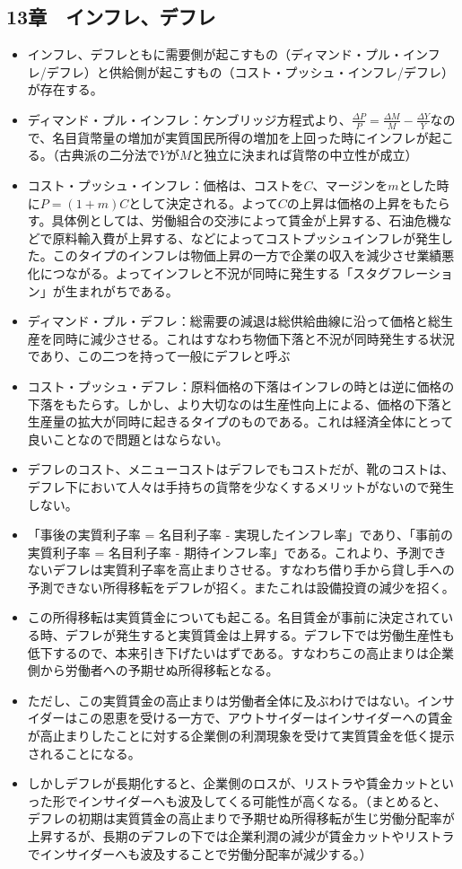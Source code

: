 \documentclass{jsarticle}
\begin{document}
\subsection{13章　インフレ、デフレ}
\begin{itemize}
	\item インフレ、デフレともに需要側が起こすもの（ディマンド・プル・インフレ/デフレ）と供給側が起こすもの（コスト・プッシュ・インフレ/デフレ）が存在する。
	\item ディマンド・プル・インフレ：ケンブリッジ方程式より、$\frac{\Delta P}{P} = \frac{\Delta M}{M} - \frac{\Delta Y}{Y}$なので、名目貨幣量の増加が実質国民所得の増加を上回った時にインフレが起こる。（古典派の二分法で$Y$が$M$と独立に決まれば貨幣の中立性が成立）
	\item コスト・プッシュ・インフレ：価格は、コストを$C$、マージンを$m$とした時に$P = ( 1 + m)C$として決定される。よって$C$の上昇は価格の上昇をもたらす。具体例としては、労働組合の交渉によって賃金が上昇する、石油危機などで原料輸入費が上昇する、などによってコストプッシュインフレが発生した。このタイプのインフレは物価上昇の一方で企業の収入を減少させ業績悪化につながる。よってインフレと不況が同時に発生する「スタグフレーション」が生まれがちである。
	\item ディマンド・プル・デフレ：総需要の減退は総供給曲線に沿って価格と総生産を同時に減少させる。これはすなわち物価下落と不況が同時発生する状況であり、この二つを持って一般にデフレと呼ぶ
	\item コスト・プッシュ・デフレ：原料価格の下落はインフレの時とは逆に価格の下落をもたらす。しかし、より大切なのは生産性向上による、価格の下落と生産量の拡大が同時に起きるタイプのものである。これは経済全体にとって良いことなので問題とはならない。
	\item デフレのコスト、メニューコストはデフレでもコストだが、靴のコストは、デフレ下において人々は手持ちの貨幣を少なくするメリットがないので発生しない。
	\item 「事後の実質利子率 = 名目利子率 - 実現したインフレ率」であり、「事前の実質利子率 = 名目利子率 - 期待インフレ率」である。これより、予測できないデフレは実質利子率を高止まりさせる。すなわち借り手から貸し手への予測できない所得移転をデフレが招く。またこれは設備投資の減少を招く。
	\item この所得移転は実質賃金についても起こる。名目賃金が事前に決定されている時、デフレが発生すると実質賃金は上昇する。デフレ下では労働生産性も低下するので、本来引き下げたいはずである。すなわちこの高止まりは企業側から労働者への予期せぬ所得移転となる。
	\item ただし、この実質賃金の高止まりは労働者全体に及ぶわけではない。インサイダーはこの恩恵を受ける一方で、アウトサイダーはインサイダーへの賃金が高止まりしたことに対する企業側の利潤現象を受けて実質賃金を低く提示されることになる。
	\item しかしデフレが長期化すると、企業側のロスが、リストラや賃金カットといった形でインサイダーへも波及してくる可能性が高くなる。（まとめると、デフレの初期は実質賃金の高止まりで予期せぬ所得移転が生じ労働分配率が上昇するが、長期のデフレの下では企業利潤の減少が賃金カットやリストラでインサイダーへも波及することで労働分配率が減少する。）
\end{itemize}
\end{document}
